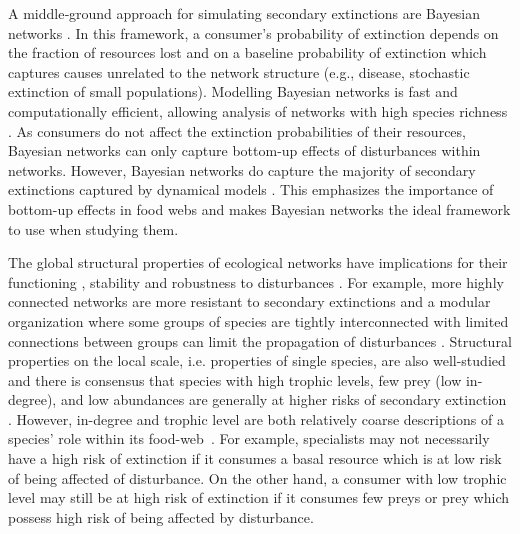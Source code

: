 \documentclass[12pt]{article}
\begin{document}
\begin{spacing}{2.0}
    
    A middle‐ground approach for simulating secondary extinctions are Bayesian networks \citep{Eklof2013}. In this framework, a consumer's probability of extinction depends on the fraction of resources lost and on a baseline probability of extinction which captures causes unrelated to the network structure (e.g., disease, stochastic extinction of small populations). Modelling Bayesian networks is fast and computationally efficient, allowing analysis of networks with high species richness \citep{Haussler2020}. 
    As consumers do not affect the extinction probabilities of their resources, Bayesian networks can only capture bottom-up effects of disturbances within networks. However, Bayesian networks do capture the majority of secondary extinctions captured by dynamical models \citep{Eklof2013}.
    This emphasizes the importance of bottom-up effects in food webs and makes Bayesian networks the ideal framework to use when studying them.  

    The global structural properties of ecological networks have implications for their functioning \citep{petchey2002functional}, stability \citep{allesina2012stability} and robustness to disturbances \citep{dunne2002network, eklof2006species}. For example, more highly connected networks are more resistant to secondary extinctions \citep{dunne2002network, eklof2006species} and a modular organization where some groups of species are tightly interconnected with limited connections between groups can limit the propagation of disturbances \citep{}.
    Structural properties on the local scale, i.e. properties of single species, are also well-studied and there is consensus that species with high trophic levels, few prey (low in-degree), and low abundances are generally at higher risks of secondary extinction \citep{binzer2011susceptibility}. However, in-degree and trophic level are both relatively coarse descriptions of a species' role within its food-web~\citep{Cirtwill2018FoodWebs}. 
    For example, specialists may not necessarily have a high risk of extinction if it consumes a basal resource which is at low risk of being affected of disturbance. On the other hand, a consumer with low trophic level may still be at high risk of extinction if it consumes few preys or prey which possess high risk of being affected by disturbance. 
    

\end{spacing}
\end{document}

